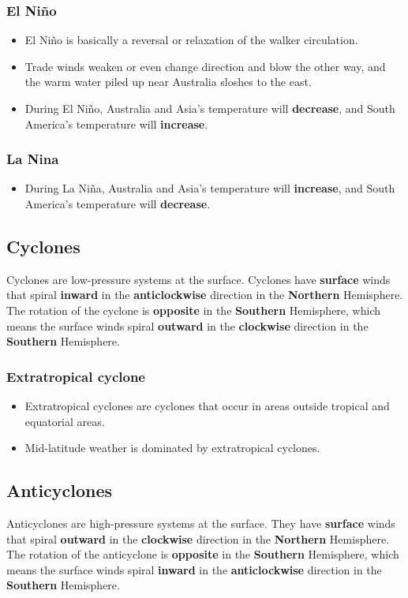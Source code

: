 \documentclass[11pt]{article}
\begin{document}
\subsubsection{El Niño}
\label{sec:org65d1fa1}
\begin{itemize}
\item El Niño is basically a reversal or relaxation of the walker circulation.
\item Trade winds weaken or even change direction and blow the other way, and the warm water piled up near Australia sloshes to the east.
\item During El Niño, Australia and Asia's temperature will \textbf{decrease}, and South America's temperature will \textbf{increase}.
\end{itemize}
\subsubsection{La Nina}
\label{sec:orga7e9fb3}
\begin{itemize}
\item During La Niña, Australia and Asia's temperature will \textbf{increase}, and South America's temperature will \textbf{decrease}.
\end{itemize}
\subsection{Cyclones}
\label{sec:org9b7d039}
Cyclones are low-pressure systems at the surface. Cyclones have \textbf{surface} winds that spiral \textbf{inward} in the \textbf{anticlockwise} direction in the \textbf{Northern} Hemisphere. The rotation of the cyclone is \textbf{opposite} in the \textbf{Southern} Hemisphere, which means the surface winds spiral \textbf{outward} in the \textbf{clockwise} direction in the \textbf{Southern} Hemisphere.
\subsubsection{Extratropical cyclone}
\label{sec:org848e9f9}
\begin{itemize}
\item Extratropical cyclones are cyclones that occur in areas outside tropical and equatorial areas.
\item Mid-latitude weather is dominated by extratropical cyclones.
\end{itemize}
\subsection{Anticyclones}
\label{sec:org3feaf40}
Anticyclones are high-pressure systems at the surface. They have \textbf{surface} winds that spiral \textbf{outward} in the \textbf{clockwise} direction in the \textbf{Northern} Hemisphere. The rotation of the anticyclone is \textbf{opposite} in the \textbf{Southern} Hemisphere, which means the surface winds spiral \textbf{inward} in the \textbf{anticlockwise} direction in the \textbf{Southern} Hemisphere.
\end{document}
